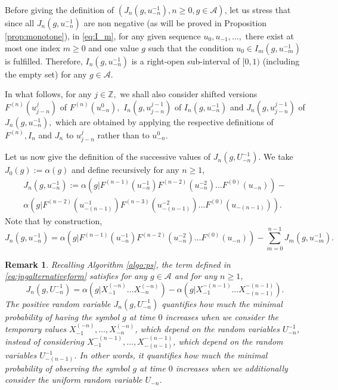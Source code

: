 \documentclass[a4paper]{article}
\newtheorem{remark}{Remark}%
\newcommand{\Z}{\mathbb{Z}}
\newcommand{\A}{\mathcal{A}}
\newcommand{\mydef}{:=}
\begin{document}
Before giving the definition of $(J_n(g,  u_{-n}^{-1}), n\geq 0, g\in \A)$, let us stress that since all $ J_n(g,u_{-n}^{-1}) $ are non negative (as will be proved in Proposition \ref{prop:monotone}), in \eqref{eq:I_m}, for any given sequence $u_0,u_{-1}, \ldots,$ there exist at most one index $ m \geq 0 $ and one value $g$ such that the condition $u_0 \in I_{m}(g,u_{-m}^{-1})$ is fulfilled.  
Therefore, $I_n(g,u_{-n}^{-1})$ is a right-open sub-interval of $[0,1)$ (including the empty set) for any $g\in \A$.

In what follows, for any $j \in \Z,$ we shall also consider shifted versions $F^{(n)}(u^j_{j-n})$ of $F^{(n)}(u^0_{-n}) ,$ $ I_n(g, u_{j-n}^{j-1})$ of $ I_n(g, u_{-n}^{-1}) $ and $J_n(g, u_{j-n}^{j-1})$ of $ J_n(g, u_{-n}^{-1}),$ which are obtained by applying the respective definitions of $F^{(n)}, I_n $ and $ J_n$ to $ u^j_{j-n} $ rather than to $ u^0_{-n}.$


Let us now give the definition of the successive values of $ J_n (g, U_{- n }^{-1}) .$
We take $J_0(g)\mydef\alpha(g)$ and define recursively for any $n\geq 1$,
\begin{multline} \label{eq:jngalternativeform}
J_{n}(g,u_{-n}^{-1})\mydef
\alpha(g|F^{(n-1)}(u_{-n}^{-1})F^{(n-2)}(u_{-n}^{-2})\ldots F^{(0)}(u_{-n}))-\\\alpha(g|F^{(n-2)}(u_{-(n-1)}^{-1})F^{(n-3)}(u_{-(n-1)}^{-2})\ldots F^{(0)}(u_{-(n-1)})) .
\end{multline}
Note that by construction, 
$$
J_{n}(g,u_{-n}^{-1})=\alpha(g|F^{(n-1)}(u_{-n}^{-1})F^{(n-2)}(u_{-n}^{-2})\ldots F^{(0)}(u_{-n}))-\sum_{m=0}^{n-1}J_{m}(g,u_{-m}^{-1}).
$$

\begin{remark}\label{remark:explainJng} %
Recalling Algorithm \ref{algo:ps}, the term defined in \eqref{eq:jngalternativeform} satisfies for any $g\in \A$ and for any $n\geq 1$,
$$
J_{n}(g,U^{-1}_{-n})=\alpha(g|X_{-1}^{(-n)}\ldots X_{-n}^{(-n)})-\alpha(g|X_{-1}^{-(n-1)}\ldots X_{-(n-1)}^{-(n-1)}).
$$  
The positive random variable $J_{n}(g,U^{-1}_{-n})$ quantifies how much the minimal probability of having the symbol $g$ at time $0$ increases when we consider the temporary values $X_{-1}^{(-n)},\ldots, X_{-n}^{(-n)}$,  which depend on the random variables $U_{-n}^{-1}$, instead of considering $X_{-1}^{-(n-1)},\ldots, X_{-(n-1)}^{-(n-1)}$, which depend on the random variables $U_{-(n-1)}^{-1}$. In other words, it quantifies how much the minimal probability of observing the symbol $g$ at time $0$ increases when we additionally consider the uniform random variable $U_{-n}$. 
\end{remark}
\end{document}
